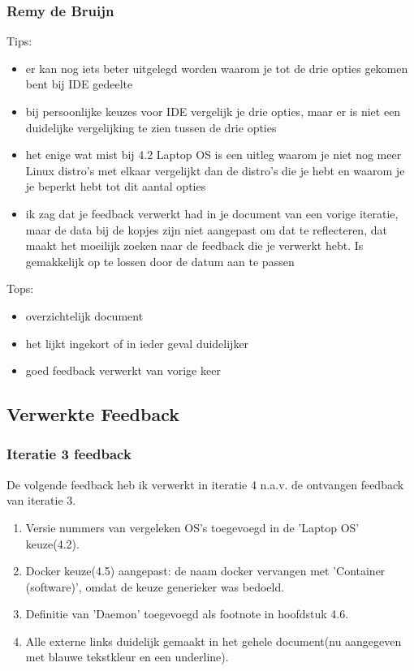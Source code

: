\documentclass[a4paper]{report}
\begin{document}
\subsubsection{Remy de Bruijn}
\noindent
Tips:
\begin{itemize}
  \item er kan nog iets beter uitgelegd worden waarom je tot de drie opties gekomen bent bij IDE gedeelte
  \item bij persoonlijke keuzes voor IDE vergelijk je drie opties, maar er is niet een duidelijke vergelijking te zien tussen de drie opties
  \item het enige wat mist bij 4.2 Laptop OS is een uitleg waarom je niet nog meer Linux distro's met elkaar vergelijkt dan de distro's die je hebt en waarom je je beperkt hebt tot dit aantal opties
  \item ik zag dat je feedback verwerkt had in je document van een vorige iteratie, maar de data bij de kopjes zijn niet aangepast om dat te reflecteren, dat maakt het moeilijk zoeken naar de feedback die je verwerkt hebt. Is gemakkelijk op te lossen door de datum aan te passen
\end{itemize}

Tops:
\begin{itemize}
  \item overzichtelijk document
  \item het lijkt ingekort of in ieder geval duidelijker
  \item goed feedback verwerkt van vorige keer
\end{itemize}


\pagebreak
\subsection{Verwerkte Feedback}
\subsubsection{Iteratie 3 feedback}
\label{verwerktefeedback1}
De volgende feedback heb ik verwerkt in iteratie 4 n.a.v. de ontvangen feedback van iteratie 3.
\begin{enumerate}
  \item Versie nummers van vergeleken OS's toegevoegd in de 'Laptop OS' keuze(4.2).
  \item Docker keuze(4.5) aangepast: de naam docker vervangen met 'Container (software)', omdat de keuze generieker was bedoeld.
  \item Definitie van 'Daemon' toegevoegd als footnote in hoofdstuk 4.6.
  \item Alle externe links duidelijk gemaakt in het gehele document(nu aangegeven met blauwe tekstkleur en een underline).
\end{enumerate}
\end{document}
